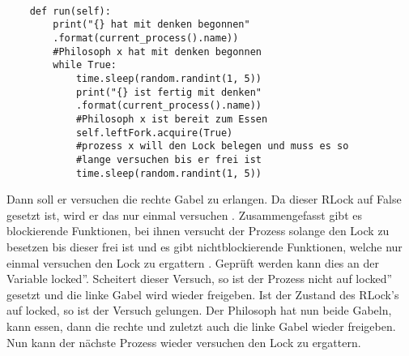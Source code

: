 \begin{lstlisting}[style = Python, label = {endloesung}, caption = {Endlösung}]

    def run(self):
        print("{} hat mit denken begonnen"
        .format(current_process().name)) 
        #Philosoph x hat mit denken begonnen
        while True:
            time.sleep(random.randint(1, 5))
            print("{} ist fertig mit denken"
            .format(current_process().name)) 
            #Philosoph x ist bereit zum Essen
            self.leftFork.acquire(True) 
            #prozess x will den Lock belegen und muss es so 
            #lange versuchen bis er frei ist
            time.sleep(random.randint(1, 5))

\end{lstlisting}

Dann soll er versuchen die rechte Gabel zu erlangen. Da dieser RLock auf False gesetzt ist, wird er das nur einmal versuchen \parencite[vgl.]{lock}. Zusammengefasst gibt es blockierende Funktionen, bei ihnen versucht der Prozess solange den Lock zu besetzen bis dieser frei ist und es gibt nichtblockierende Funktionen, welche nur einmal versuchen den Lock zu ergattern \parencite[vgl.][S.164]{sturm2001}. Geprüft werden kann dies an der Variable \glqq locked''. Scheitert dieser Versuch, so ist der Prozess nicht auf \glqq locked'' gesetzt und die linke Gabel wird wieder freigeben. Ist der Zustand des RLock's auf locked, so ist der Versuch gelungen.  Der Philosoph hat nun beide Gabeln, kann essen, dann die rechte und zuletzt auch die linke Gabel wieder freigeben. Nun kann der nächste Prozess wieder versuchen den Lock zu ergattern.

